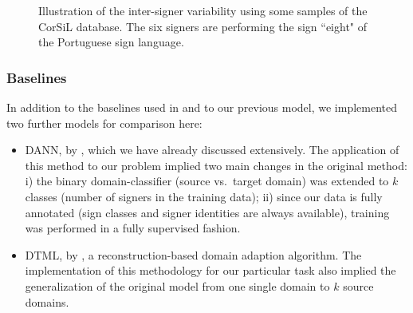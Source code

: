 \begin{figure}[t]
\begin{minipage}[t]{0.3\columnwidth}
    \end{minipage}
    \hspace{0.00mm}
    \begin{minipage}[t]{0.3\columnwidth}
    \end{minipage}
    \hspace{0.00mm}
    \begin{minipage}[t]{0.3\columnwidth}
    \end{minipage}
    \caption{Illustration of the inter-signer variability using some samples of the CorSiL database. The six signers are performing the sign ``eight" of the Portuguese sign language.}
    \label{fig:corsil}
\end{figure}

\subsubsection{Baselines}
In addition to the baselines used in  and to our previous model, we implemented two further models for comparison here:
\begin{itemize}
    \item DANN, by \citet{Ganin2015}, which we have already discussed extensively. The application of this method to our problem implied two main changes in the original method: i) the binary domain-classifier (source vs.\ target domain) was extended to $k$ classes (number of signers in the training data); ii) since our data is fully annotated (sign classes and signer identities are always available), training was performed in a fully supervised fashion.
    \item DTML, by \citet{Hu2016}, a reconstruction-based domain adaption algorithm. The implementation of this methodology for our particular task also implied the generalization of the original model from one single domain to $k$ source domains.
\end{itemize}

